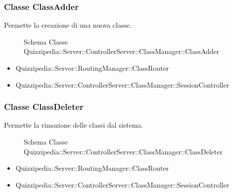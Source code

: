 \subsubsection{Classe ClassAdder}
Permette la creazione di una nuova classe.
\begin{figure}[H]
\centering
\noindent{}
\caption[Schema Classe ClassAdder]{Schema Classe Quizzipedia::Server::ControllerServer::ClassManager::ClassAdder}
\end{figure}
\begin{itemize}
\item Quizzipedia::Server::RoutingManager::ClassRouter
\end{itemize}
\begin{itemize}
\item Quizzipedia::Server::ControllerServer::ClassManager::SessionController
\end{itemize}
\subsubsection{Classe ClassDeleter}
Permette la rimozione delle classi dal sistema.
\begin{figure}[H]
\centering
\noindent{}
\caption[Schema Classe ClassDeleter]{Schema Classe Quizzipedia::Server::ControllerServer::ClassManager::ClassDeleter}
\end{figure}
\begin{itemize}
\item Quizzipedia::Server::RoutingManager::ClassRouter
\end{itemize}
\begin{itemize}
\item Quizzipedia::Server::ControllerServer::ClassManager::SessionController
\end{itemize}
